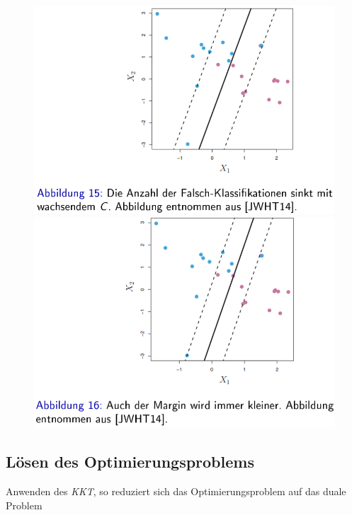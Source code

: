 \documentclass{report}
\begin{document}
\begin{figure}[H]
  \centering
  \begin{minipage}[b]{0.4\textwidth}
    \includegraphics[scale=.265]{ml06_15}
  \end{minipage}
  \hfill
  \begin{minipage}[b]{0.4\textwidth}
    \includegraphics[scale=.275]{ml06_16}
  \end{minipage}
\end{figure}

\subsection{Lösen des Optimierungsproblems}
Anwenden des \textit{KKT}, so reduziert sich das Optimierungsproblem auf das duale Problem
\end{document}
